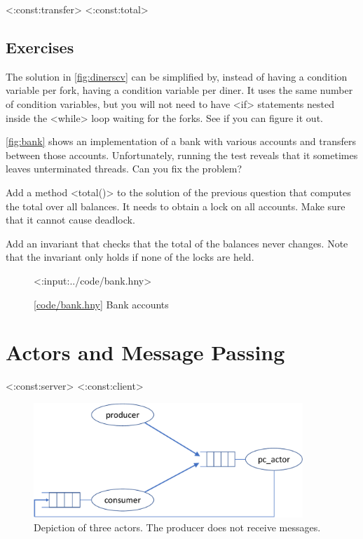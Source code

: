\documentclass{report}
\newcommand{\harmonylink}[1]{%
[\href{https://harmony.cs.cornell.edu/#1}{\underline{#1}}]%
}
\newenvironment{code}{
\tcolorbox
}{
\endtcolorbox
}
\begin{document}
<{:const:transfer}>
<{:const:total}>

\section*{Exercises}
\begin{problems}
\item The solution in \autoref{fig:dinerscv} can be simplified by, instead
of having a condition variable per fork, having a condition variable per
diner.  It uses the same number of condition variables, but you will not
need to have <{if}> statements nested inside the <{while}> loop
waiting for the forks.  See if you can figure it out.
\item \label{ex:bank} \autoref{fig:bank} shows an implementation of a bank with various
accounts and transfers between those accounts.
Unfortunately, running the test reveals that it sometimes leaves unterminated
threads.  Can you fix the problem?
\item Add a method <{total()}> to the solution of the previous question
that computes the total over all balances.
It needs to obtain a lock on all accounts.  Make sure that
it cannot cause deadlock.
\item Add an invariant that checks that the total of the balances never
changes.  Note that the invariant only holds if none of the locks are
held.
\end{problems}

\begin{figure}
\begin{code}
<{:input:../code/bank.hny}>
\end{code}
\caption{\harmonylink{code/bank.hny} Bank accounts}
\label{fig:bank}
\end{figure}

\chapter{Actors and Message Passing}
\label{ch:actor}
%
%

<{:const:server}>
<{:const:client}>

%

\begin{figure}
\begin{center}
\includegraphics[width=4in]{figures/actor-crop.pdf}
\end{center}
\caption{Depiction of three actors.  The producer does not receive messages.}
\label{fig:actorpic}
\end{figure}
\end{document}
